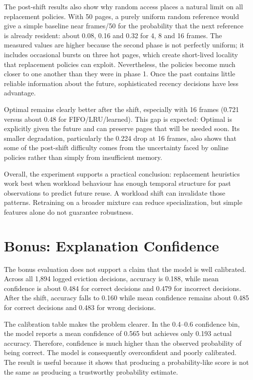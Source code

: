 \documentclass[11pt,a4paper]{article}
\begin{document}
The post-shift results also show why random access places a natural limit on all replacement policies. With 50 pages, a purely uniform random reference would give a simple baseline near frames/50 for the probability that the next reference is already resident: about 0.08, 0.16 and 0.32 for 4, 8 and 16 frames. The measured values are higher because the second phase is not perfectly uniform; it includes occasional bursts on three hot pages, which create short-lived locality that replacement policies can exploit. Nevertheless, the policies become much closer to one another than they were in phase 1. Once the past contains little reliable information about the future, sophisticated recency decisions have less advantage.

Optimal remains clearly better after the shift, especially with 16 frames (0.721 versus about 0.48 for FIFO/LRU/learned). This gap is expected: Optimal is explicitly given the future and can preserve pages that will be needed soon. Its smaller degradation, particularly the 0.224 drop at 16 frames, also shows that some of the post-shift difficulty comes from the uncertainty faced by online policies rather than simply from insufficient memory.

Overall, the experiment supports a practical conclusion: replacement heuristics work best when workload behaviour has enough temporal structure for past observations to predict future reuse. A workload shift can invalidate those patterns. Retraining on a broader mixture can reduce specialization, but simple features alone do not guarantee robustness.

\section{Bonus: Explanation Confidence}
The bonus evaluation does not support a claim that the model is well calibrated. Across all 1,894 logged eviction decisions, accuracy is 0.188, while mean confidence is about 0.484 for correct decisions and 0.479 for incorrect decisions. After the shift, accuracy falls to 0.160 while mean confidence remains about 0.485 for correct decisions and 0.483 for wrong decisions.

The calibration table makes the problem clearer. In the 0.4--0.6 confidence bin, the model reports a mean confidence of 0.565 but achieves only 0.193 actual accuracy. Therefore, confidence is much higher than the observed probability of being correct. The model is consequently overconfident and poorly calibrated. The result is useful because it shows that producing a probability-like score is not the same as producing a trustworthy probability estimate.
\end{document}
